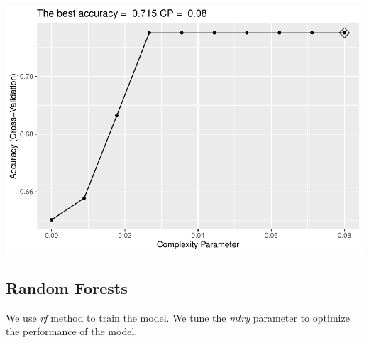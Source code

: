 \documentclass[]{article}
\newenvironment{Shaded}{\begin{snugshade}}{\end{snugshade}}
\newcommand{\CommentTok}[1]{\textcolor[rgb]{0.56,0.35,0.01}{\textit{#1}}}
\newcommand{\DataTypeTok}[1]{\textcolor[rgb]{0.13,0.29,0.53}{#1}}
\newcommand{\KeywordTok}[1]{\textcolor[rgb]{0.13,0.29,0.53}{\textbf{#1}}}
\newcommand{\NormalTok}[1]{#1}
\newcommand{\OperatorTok}[1]{\textcolor[rgb]{0.81,0.36,0.00}{\textbf{#1}}}
\newcommand{\StringTok}[1]{\textcolor[rgb]{0.31,0.60,0.02}{#1}}
\begin{document}
\includegraphics{LiverDisease_files/figure-latex/unnamed-chunk-31-1.pdf}

\begin{Shaded}
\end{Shaded}

\subsection{Random Forests}

We use \emph{rf} method to train the model. We tune the \emph{mtry}
parameter to optimize the performance of the model.
\end{document}
